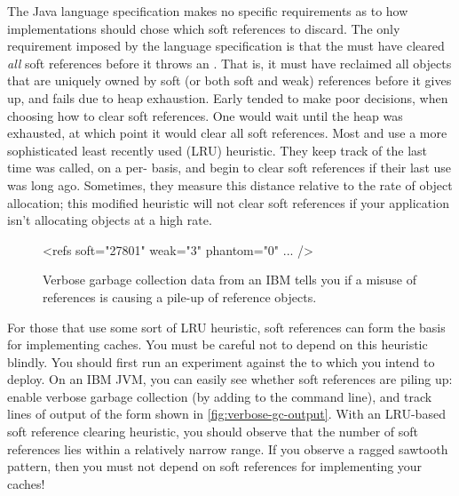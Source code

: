 The Java language specification makes no specific requirements as to how \jre
implementations should chose which soft references to discard. The only
requirement imposed by the language specification is that the \jre must have
cleared \emph{all} soft references before it throws an
. That is, it must have reclaimed all objects that
are uniquely owned by soft (or both soft and weak) references before it gives up,
and fails due to heap exhaustion. Early \jres tended to make poor decisions, when
choosing how to clear soft references. One \jre would wait until the heap was
exhausted, at which point it would clear all soft references. Most \javafive and
\javasix \jres use a more sophisticated least recently used (LRU) heuristic.
They keep track of the last time  was called, on a per-
basis, and begin to clear soft references if their last use was long ago.
Sometimes, they measure this distance relative to the rate of object allocation;
this modified heuristic will not clear soft references if your application isn't
allocating objects at a high rate.

\begin{wrapfigure}[8]{l}{0.395\textwidth}
\centering
\begin{framedlisting}
<refs soft="27801" weak="3" phantom="0" ... />
\end{framedlisting}
\caption{Verbose garbage collection data from an IBM \jre tells you
if a misuse of references is causing a pile-up of reference objects.}
\label{fig:verbose-gc-output}
\end{wrapfigure}
For those \jres that use some sort of LRU heuristic, soft references can form the
basis for implementing caches. You must be careful not to depend on this
heuristic blindly. You should first run an experiment against the \jre to which
you intend to deploy. On an IBM JVM, you can easily see whether soft references
are piling up: enable verbose
garbage collection (by adding  to the
command line), and track lines of output of the form shown in
\autoref{fig:verbose-gc-output}. With an LRU-based soft reference clearing
heuristic, you should observe that the number of soft references lies
within a relatively narrow range. If you
observe a ragged sawtooth pattern, then you must not
depend on soft references for implementing your caches!




